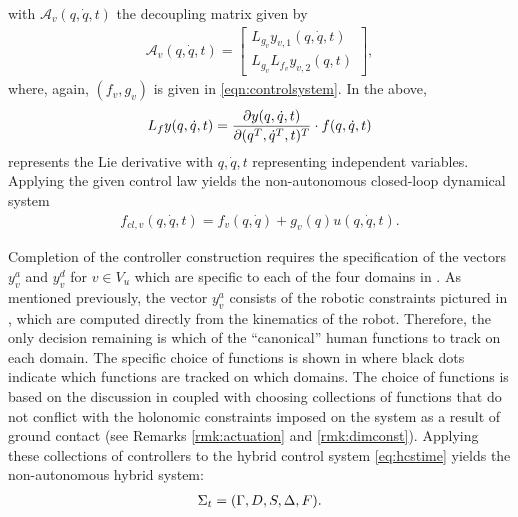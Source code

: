 with $\mathcal{A}_{v}(q, {\dot q},t)$ the decoupling matrix given by
\begin{align}
  \mathcal{A}_{v}(q, {\dot q},t) =
  \left[\begin{array}{c}
      L_{g_{v}} y_{v,1} (q, {\dot q}, t)\\
      L_{g_{v}} L_{f_{v}} y_{v,2}(q,t)
    \end{array}\right],
\end{align}
where, again, $(f_{v},g_{v})$ is given in \eqref{eqn:controlsystem}. In the above,
\begin{align}
  L_{f} y(q, {\dot q}, t) = \frac{\partial{y(q, {\dot q}, t)}}{\partial{(q^T, {\dot q}^T, t)^T}} \cdot f(q, \dot q, t)
\end{align} represents the Lie derivative with $q, {\dot q}, t$ representing independent variables.
Applying the given control law yields the non-autonomous closed-loop dynamical system
\begin{align}
  \label{eq:clsys}
  f_\mathit{cl,v}(q, {\dot q},t) = f_v(q, {\dot q}) + g_v(q) u(q, {\dot q}, t).
\end{align}

Completion of the controller construction requires the specification of the vectors $y^{a}_{v}$ and $y^{d}_{v}$ for $v \in V_u$ which are specific to each of the four domains in . As mentioned previously, the vector $y^a_v$ consists of the robotic constraints pictured in , which are computed directly from the kinematics of the robot. Therefore, the only decision remaining is which of the ``canonical'' human functions to track on each domain. The specific choice of functions is shown in  where black dots indicate which functions are tracked on which domains. The choice of functions is based on the discussion in  coupled with choosing collections of functions that do not conflict with the holonomic constraints imposed on the system as a result of ground contact (see Remarks \ref{rmk:actuation} and \ref{rmk:dimconst}). Applying these collections of controllers to the hybrid control system \eqref{eq:hcstime} yields the non-autonomous hybrid system:
\begin{align}
  \label{eq:hstime}
  \Sigma_t = (\Gamma, D, S, \Delta, F).
\end{align}

